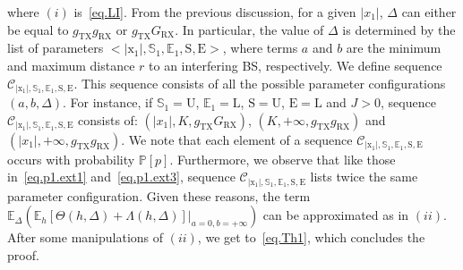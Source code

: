 \documentclass[10pt,journal,a4paper]{IEEEtran}
\begin{document}
where $(i)$ is~\eqref{eq.LI}. From the previous discussion, for a given $|x_1|$, $\Delta$ can either be equal to $g_\mathrm{TX}g_\mathrm{RX}$ or $g_\mathrm{TX}G_\mathrm{RX}$. In particular, the value of $\Delta$ is determined by the list of parameters \mbox{$<\mathrm{|x_1|,\mathbb{S}_1,\mathbb{E}_1,S,E}>$}, where terms $a$ and $b$ are the minimum and maximum distance $r$ to an interfering BS, respectively. We define sequence $\mathcal{C}_{\mathrm{|x_1|,\mathbb{S}_1,\mathbb{E}_1,S,E}}$. This sequence consists of all the possible parameter configurations $(a,b,\Delta)$. For instance, if $\mathbb{S}_1 = \mathrm{U}$, $\mathbb{E}_1 = \mathrm{L}$, \mbox{$\mathrm{S} = \mathrm{U}$}, \mbox{$\mathrm{E} = \mathrm{L}$} and \mbox{$J > 0$}, sequence $\mathcal{C}_{\mathrm{|x_1|,\mathbb{S}_1,\mathbb{E}_1,S,E}}$ consists of: $(|x_1|,K,g_\mathrm{TX}G_\mathrm{RX})$, $(K,+\infty,g_\mathrm{TX}g_\mathrm{RX})$ and $(|x_1|,+\infty,g_\mathrm{TX}g_\mathrm{RX})$. We note that each element of a sequence $\mathcal{C}_{\mathrm{|x_1|,\mathbb{S}_1,\mathbb{E}_1,S,E}}$ occurs with probability $\mathbb{P}[p]$. Furthermore, we observe that like those in~\eqref{eq.p1.ext1} and~\eqref{eq.p1.ext3}, sequence $\mathcal{C}_{\mathrm{|x_1|,\mathbb{S}_1,\mathbb{E}_1,S,E}}$ lists twice the same parameter configuration. Given these reasons, the term \mbox{$\mathbb{E}_\Delta(\mathbb{E}_h [\Theta(h,\Delta) + \Lambda(h,\Delta)]\big|_{a = 0,b = +\infty})$} can be approximated as in $(ii)$. After some manipulations of $(ii)$, we get to~\eqref{eq.Th1}, which concludes the proof.



\end{document}
